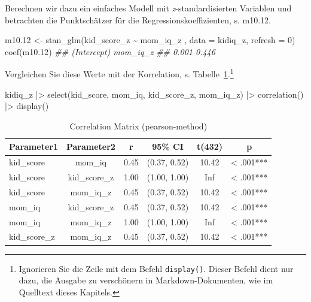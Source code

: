 \documentclass[
  ngerman,
  letterpaper,
  twoside,
  open=any]{scrbook}
\newenvironment{Shaded}{\begin{snugshade}}{\end{snugshade}}
\newcommand{\AttributeTok}[1]{\textcolor[rgb]{0.40,0.45,0.13}{#1}}
\newcommand{\DecValTok}[1]{\textcolor[rgb]{0.68,0.00,0.00}{#1}}
\newcommand{\DocumentationTok}[1]{\textcolor[rgb]{0.37,0.37,0.37}{\textit{#1}}}
\newcommand{\FloatTok}[1]{\textcolor[rgb]{0.68,0.00,0.00}{#1}}
\newcommand{\FunctionTok}[1]{\textcolor[rgb]{0.28,0.35,0.67}{#1}}
\newcommand{\NormalTok}[1]{\textcolor[rgb]{0.00,0.23,0.31}{#1}}
\newcommand{\OtherTok}[1]{\textcolor[rgb]{0.00,0.23,0.31}{#1}}
\newcommand{\SpecialCharTok}[1]{\textcolor[rgb]{0.37,0.37,0.37}{#1}}
\theoremstyle{definition}
\theoremstyle{plain}
\theoremstyle{definition}
\theoremstyle{definition}
\theoremstyle{definition}
\theoremstyle{definition}
\theoremstyle{remark}
\begin{document}
Berechnen wir dazu ein einfaches Modell mit \emph{z}-standardisierten
Variablen und betrachten die Punktschätzer für die
Regressionskoeffizienten, s. m10.12.

\begin{Shaded}
\begin{Highlighting}[]
\NormalTok{m10}\FloatTok{.12} \OtherTok{\textless{}{-}} 
  \FunctionTok{stan\_glm}\NormalTok{(kid\_score\_z }\SpecialCharTok{\textasciitilde{}}\NormalTok{ mom\_iq\_z , }\AttributeTok{data =}\NormalTok{ kidiq\_z, }\AttributeTok{refresh =} \DecValTok{0}\NormalTok{)}
\FunctionTok{coef}\NormalTok{(m10}\FloatTok{.12}\NormalTok{)}
\DocumentationTok{\#\# (Intercept)    mom\_iq\_z }
\DocumentationTok{\#\#       0.001       0.446}
\end{Highlighting}
\end{Shaded}

Vergleichen Sie diese Werte mit der Korrelation, s.
Tabelle~\ref{tbl-m10.12-corr}.\footnote{Ignorieren Sie die Zeile mit dem
  Befehl \texttt{display()}. Dieser Befehl dient nur dazu, die Ausgabe
  zu verschönern in Markdown-Dokumenten, wie im Quelltext dieses
  Kapitels.}

\begin{Shaded}
\begin{Highlighting}[]
\NormalTok{kidiq\_z }\SpecialCharTok{|\textgreater{}} 
  \FunctionTok{select}\NormalTok{(kid\_score, mom\_iq, kid\_score\_z, mom\_iq\_z) }\SpecialCharTok{|\textgreater{}} 
  \FunctionTok{correlation}\NormalTok{() }\SpecialCharTok{|\textgreater{}} 
  \FunctionTok{display}\NormalTok{()}
\end{Highlighting}
\end{Shaded}

{

\begin{longtable}[]{@{}lccccc@{}}

\caption{\label{tbl-m10.12-corr}Correlation Matrix (pearson-method)}

\tabularnewline

\toprule\noalign{}
Parameter1 & Parameter2 & r & 95\% CI & t(432) & p \\
\midrule\noalign{}
\endhead
\bottomrule\noalign{}
\endlastfoot
kid\_score & mom\_iq & 0.45 & (0.37, 0.52) & 10.42 & \textless{}
.001*** \\
kid\_score & kid\_score\_z & 1.00 & (1.00, 1.00) & Inf & \textless{}
.001*** \\
kid\_score & mom\_iq\_z & 0.45 & (0.37, 0.52) & 10.42 & \textless{}
.001*** \\
mom\_iq & kid\_score\_z & 0.45 & (0.37, 0.52) & 10.42 & \textless{}
.001*** \\
mom\_iq & mom\_iq\_z & 1.00 & (1.00, 1.00) & Inf & \textless{}
.001*** \\
kid\_score\_z & mom\_iq\_z & 0.45 & (0.37, 0.52) & 10.42 & \textless{}
.001*** \\

\end{longtable}

}
\end{document}
